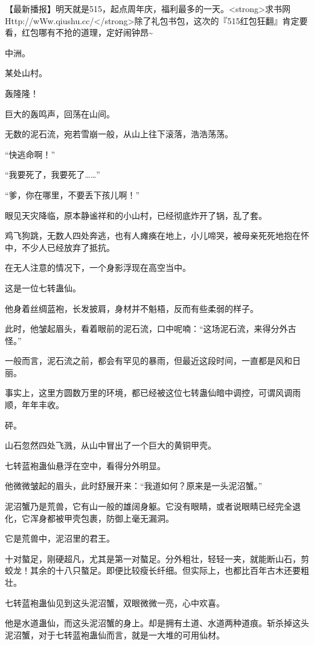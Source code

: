 
\begin{this_body}

【最新播报】明天就是515，起点周年庆，福利最多的一天。<strong>求书网Http://wWw.qiushu.cc/</strong>除了礼包书包，这次的『515红包狂翻』肯定要看，红包哪有不抢的道理，定好闹钟昂\~{}

中洲。

某处山村。

轰隆隆！

巨大的轰鸣声，回荡在山间。

无数的泥石流，宛若雪崩一般，从山上往下滚落，浩浩荡荡。

“快逃命啊！”

“我要死了，我要死了……”

“爹，你在哪里，不要丢下孩儿啊！”

眼见天灾降临，原本静谧祥和的小山村，已经彻底炸开了锅，乱了套。

鸡飞狗跳，无数人四处奔逃，也有人瘫痪在地上，小儿啼哭，被母亲死死地抱在怀中，不少人已经放弃了抵抗。

在无人注意的情况下，一个身影浮现在高空当中。

这是一位七转蛊仙。

他身着丝绸蓝袍，长发披肩，身材并不魁梧，反而有些柔弱的样子。

此时，他皱起眉头，看着眼前的泥石流，口中呢喃：“这场泥石流，来得分外古怪。”

一般而言，泥石流之前，都会有罕见的暴雨，但最近这段时间，一直都是风和日丽。

事实上，这里方圆数万里的环境，都已经被这位七转蛊仙暗中调控，可谓风调雨顺，年年丰收。

砰。

山石忽然四处飞溅，从山中冒出了一个巨大的黄铜甲壳。

七转蓝袍蛊仙悬浮在空中，看得分外明显。

他微微皱起的眉头，此时舒展开来：“我道如何？原来是一头泥沼蟹。”

泥沼蟹乃是荒兽，它有山一般的雄阔身躯。它没有眼睛，或者说眼睛已经完全退化，它浑身都被甲壳包裹，防御上毫无漏洞。

它是荒兽中，泥沼里的君王。

十对螯足，刚硬超凡，尤其是第一对螯足。分外粗壮，轻轻一夹，就能断山石，剪蛟龙！其余的十八只螯足。即便比较瘦长纤细。但实际上，也都比百年古木还要粗壮。

七转蓝袍蛊仙见到这头泥沼蟹，双眼微微一亮，心中欢喜。

他是水道蛊仙，而这头泥沼蟹的身上。却是拥有土道、水道两种道痕。斩杀掉这头泥沼蟹，对于七转蓝袍蛊仙而言，就是一大堆的可用仙材。


\end{this_body}
